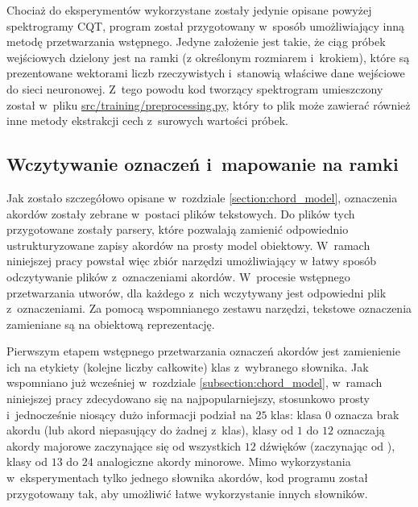 Chociaż do eksperymentów wykorzystane zostały jedynie opisane powyżej spektrogramy CQT, program został przygotowany w~sposób umożliwiający inną metodę przetwarzania wstępnego. Jedyne założenie jest takie, że ciąg próbek wejściowych dzielony jest na ramki (z określonym rozmiarem i~krokiem), które są prezentowane wektorami liczb rzeczywistych i~stanowią właściwe dane wejściowe do sieci neuronowej. Z~tego powodu kod tworzący spektrogram umieszczony został w~pliku \url{src/training/preprocessing.py}, który to plik może zawierać również inne metody ekstrakcji cech z~surowych wartości próbek.

\subsection{Wczytywanie oznaczeń i~mapowanie na ramki}

Jak zostało szczegółowo opisane w~rozdziale \ref{section:chord_model}, oznaczenia akordów zostały zebrane w~postaci plików tekstowych. Do plików tych przygotowane zostały parsery, które pozwalają zamienić odpowiednio ustrukturyzowane zapisy akordów na prosty model obiektowy. W~ramach niniejszej pracy powstał więc zbiór narzędzi umożliwiający w łatwy sposób odczytywanie plików z~oznaczeniami akordów.  W~procesie wstępnego przetwarzania utworów, dla każdego z~nich wczytywany jest odpowiedni plik z~oznaczeniami. Za pomocą wspomnianego zestawu narzędzi, tekstowe oznaczenia zamieniane są na obiektową reprezentację.

Pierwszym etapem wstępnego przetwarzania oznaczeń akordów jest zamienienie ich na etykiety (kolejne liczby całkowite) klas z~wybranego słownika. Jak wspomniano już wcześniej w~rozdziale \ref{subsection:chord_model}, w~ramach niniejszej pracy zdecydowano się na najpopularniejszy, stosunkowo prosty i~jednocześnie niosący dużo informacji podział na $25$ klas: klasa $0$ oznacza brak akordu (lub akord niepasujący do żadnej z~klas), klasy od $1$ do $12$ oznaczają akordy majorowe zaczynające się od wszystkich $12$ dźwięków (zaczynając od ), klasy od $13$ do $24$ analogiczne akordy minorowe. Mimo wykorzystania w~eksperymentach tylko jednego słownika akordów, kod programu został przygotowany tak, aby umożliwić łatwe wykorzystanie innych słowników.

